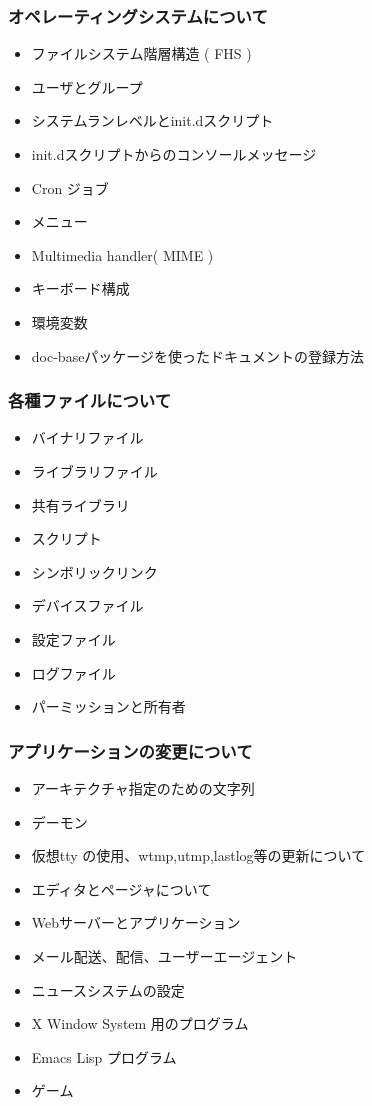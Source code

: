 \documentclass[mingoth,a4paper]{jsarticle}
\begin{document}
    \subsubsection{オペレーティングシステムについて}
\begin{itemize}
        \item ファイルシステム階層構造 ( FHS )
        \item ユーザとグループ
        \item システムランレベルとinit.dスクリプト
        \item init.dスクリプトからのコンソールメッセージ
        \item Cron ジョブ
        \item メニュー
        \item Multimedia handler( MIME )
        \item キーボード構成
        \item 環境変数
        \item doc-baseパッケージを使ったドキュメントの登録方法
\end{itemize}
    \subsubsection{各種ファイルについて}
\begin{itemize}
        \item バイナリファイル
        \item ライブラリファイル
        \item 共有ライブラリ
        \item スクリプト
        \item シンボリックリンク
        \item デバイスファイル
        \item 設定ファイル
        \item ログファイル
        \item パーミッションと所有者
\end{itemize}

    \subsubsection{アプリケーションの変更について}
\begin{itemize}
        \item アーキテクチャ指定のための文字列
        \item デーモン
        \item 仮想tty の使用、wtmp,utmp,lastlog等の更新について
        \item エディタとページャについて
        \item Webサーバーとアプリケーション
        \item メール配送、配信、ユーザーエージェント
        \item ニュースシステムの設定
        \item X Window System 用のプログラム
        \item Emacs Lisp プログラム
        \item ゲーム
\end{itemize}
\end{document}
